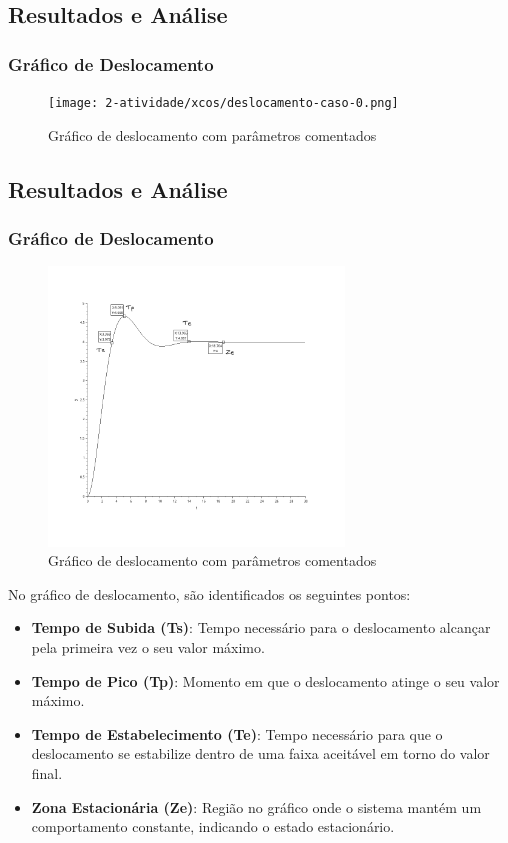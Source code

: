 \subsection{Resultados e Análise}
\subsubsection{Gráfico de Deslocamento}
\begin{figure}[H]
    \centering
    \texttt{[image: 2-atividade/xcos/deslocamento-caso-0.png]}
    \caption{Gráfico de deslocamento com parâmetros comentados}
\end{figure}

\subsection{Resultados e Análise}
\subsubsection{Gráfico de Deslocamento}
\begin{figure}[H]
    \centering
    \includegraphics[width=0.7\textwidth]{2-atividade/assets/deslocamento-comentado.png}
    \caption{Gráfico de deslocamento com parâmetros comentados}
\end{figure}
No gráfico de deslocamento, são identificados os seguintes pontos:
\begin{itemize}
    \item \textbf{Tempo de Subida (Ts)}: Tempo necessário para o deslocamento alcançar pela primeira vez o seu valor máximo.
    \item \textbf{Tempo de Pico (Tp)}: Momento em que o deslocamento atinge o seu valor máximo.
    \item \textbf{Tempo de Estabelecimento (Te)}: Tempo necessário para que o deslocamento se estabilize dentro de uma faixa aceitável em torno do valor final.
    \item \textbf{Zona Estacionária (Ze)}: Região no gráfico onde o sistema mantém um comportamento constante, indicando o estado estacionário.
\end{itemize}

